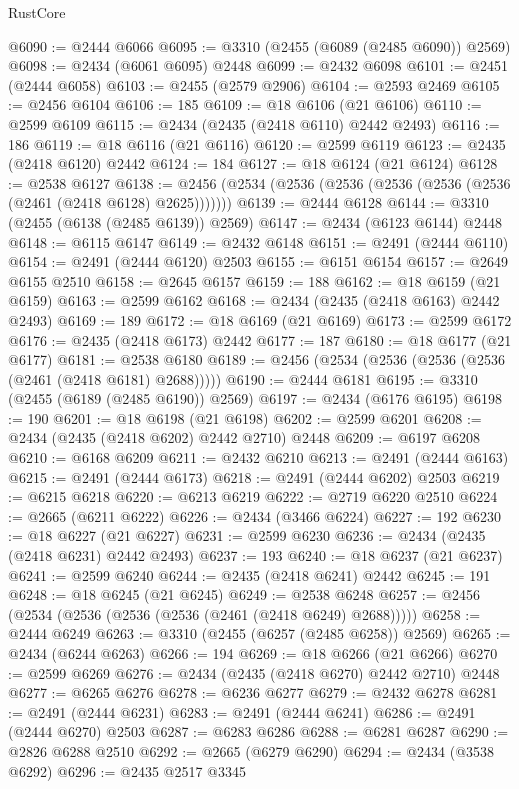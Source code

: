 \begin{lexlean}{RustCore}
\begin{coremodule}
@6090 := @2444 @6066
@6095 := @3310 (@2455 (@6089 (@2485 @6090)) @2569)
@6098 := @2434 (@6061 @6095) @2448
@6099 := @2432 @6098
@6101 := @2451 (@2444 @6058)
@6103 := @2455 (@2579 @2906)
@6104 := @2593 @2469
@6105 := @2456 @6104
@6106 := 185
@6109 := @18 @6106 (@21 @6106)
@6110 := @2599 @6109
@6115 := @2434 (@2435 (@2418 @6110) @2442 @2493)
@6116 := 186
@6119 := @18 @6116 (@21 @6116)
@6120 := @2599 @6119
@6123 := @2435 (@2418 @6120) @2442
@6124 := 184
@6127 := @18 @6124 (@21 @6124)
@6128 := @2538 @6127
@6138 := @2456 (@2534 (@2536 (@2536 (@2536 (@2536 (@2536 (@2461 (@2418 @6128) @2625)))))))
@6139 := @2444 @6128
@6144 := @3310 (@2455 (@6138 (@2485 @6139)) @2569)
@6147 := @2434 (@6123 @6144) @2448
@6148 := @6115 @6147
@6149 := @2432 @6148
@6151 := @2491 (@2444 @6110)
@6154 := @2491 (@2444 @6120) @2503
@6155 := @6151 @6154
@6157 := @2649 @6155 @2510
@6158 := @2645 @6157
@6159 := 188
@6162 := @18 @6159 (@21 @6159)
@6163 := @2599 @6162
@6168 := @2434 (@2435 (@2418 @6163) @2442 @2493)
@6169 := 189
@6172 := @18 @6169 (@21 @6169)
@6173 := @2599 @6172
@6176 := @2435 (@2418 @6173) @2442
@6177 := 187
@6180 := @18 @6177 (@21 @6177)
@6181 := @2538 @6180
@6189 := @2456 (@2534 (@2536 (@2536 (@2536 (@2461 (@2418 @6181) @2688)))))
@6190 := @2444 @6181
@6195 := @3310 (@2455 (@6189 (@2485 @6190)) @2569)
@6197 := @2434 (@6176 @6195)
@6198 := 190
@6201 := @18 @6198 (@21 @6198)
@6202 := @2599 @6201
@6208 := @2434 (@2435 (@2418 @6202) @2442 @2710) @2448
@6209 := @6197 @6208
@6210 := @6168 @6209
@6211 := @2432 @6210
@6213 := @2491 (@2444 @6163)
@6215 := @2491 (@2444 @6173)
@6218 := @2491 (@2444 @6202) @2503
@6219 := @6215 @6218
@6220 := @6213 @6219
@6222 := @2719 @6220 @2510
@6224 := @2665 (@6211 @6222)
@6226 := @2434 (@3466 @6224)
@6227 := 192
@6230 := @18 @6227 (@21 @6227)
@6231 := @2599 @6230
@6236 := @2434 (@2435 (@2418 @6231) @2442 @2493)
@6237 := 193
@6240 := @18 @6237 (@21 @6237)
@6241 := @2599 @6240
@6244 := @2435 (@2418 @6241) @2442
@6245 := 191
@6248 := @18 @6245 (@21 @6245)
@6249 := @2538 @6248
@6257 := @2456 (@2534 (@2536 (@2536 (@2536 (@2461 (@2418 @6249) @2688)))))
@6258 := @2444 @6249
@6263 := @3310 (@2455 (@6257 (@2485 @6258)) @2569)
@6265 := @2434 (@6244 @6263)
@6266 := 194
@6269 := @18 @6266 (@21 @6266)
@6270 := @2599 @6269
@6276 := @2434 (@2435 (@2418 @6270) @2442 @2710) @2448
@6277 := @6265 @6276
@6278 := @6236 @6277
@6279 := @2432 @6278
@6281 := @2491 (@2444 @6231)
@6283 := @2491 (@2444 @6241)
@6286 := @2491 (@2444 @6270) @2503
@6287 := @6283 @6286
@6288 := @6281 @6287
@6290 := @2826 @6288 @2510
@6292 := @2665 (@6279 @6290)
@6294 := @2434 (@3538 @6292)
@6296 := @2435 @2517 @3345

\end{coremodule}
\end{lexlean}
